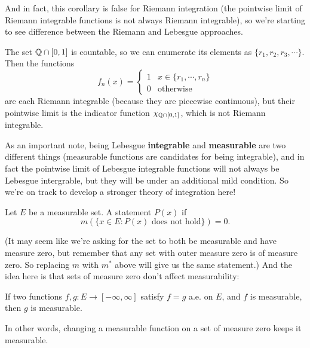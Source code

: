 And in fact, this corollary is false for Riemann integration (the pointwise limit of Riemann integrable functions is not always Riemann integrable), so we're starting to see difference between the Riemann and Lebesgue approaches.

\begin{example}
The set $\mathbb Q \cap [0, 1]$ is countable, so we can enumerate its elements as $\{r_1, r_2, r_3, \cdots\}$. Then the functions 
\[
    f_n(x) = \begin{cases} 1 & x \in \{r_1, \cdots, r_n\} \\ 0 & \text{otherwise}\end{cases}
\]
are each Riemann integrable (because they are piecewise continuous), but their pointwise limit is the indicator function $\chi_{\mathbb Q \cap [0, 1]}$, which is not Riemann integrable.
\end{example}

As an important note, being Lebesgue \textbf{integrable} and \textbf{measurable} are two different things (measurable functions are candidates for being integrable), and in fact the pointwise limit of Lebesgue integrable functions will not always be Lebesgue intergrable, but they will be under an additional mild condition. So we're on track to develop a stronger theory of integration here!

\begin{definition}
Let $E$ be a measurable set. A statement $P(x)$  if 
\[
    m\left(\{x \in E: P(x) \text{ does not hold}\}\right) = 0.
\]
\end{definition}

(It may seem like we're asking for the set to both be measurable and have measure zero, but remember that any set with outer measure zero is of measure zero. So replacing $m$ with $m^\ast$ above will give us the same statement.) And the idea here is that sets of measure zero don't affect measurability:

\begin{theorem}
If two functions $f, g: E \to [-\infty, \infty]$ satisfy $f = g$ a.e. on $E$, and $f$ is measurable, then $g$ is measurable.
\end{theorem}

In other words, changing a measurable function on a set of measure zero keeps it measurable.

